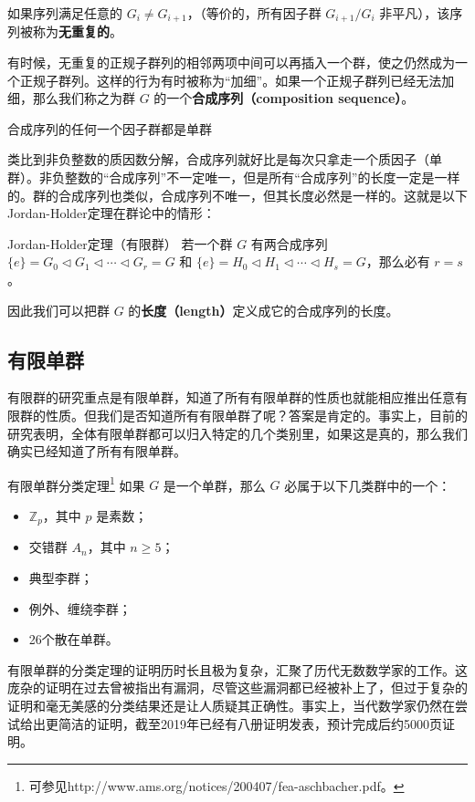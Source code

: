 如果序列满足任意的 $G_{i} \neq G_{i+1}$，（等价的，所有因子群 $G_{i+1} / G_{i}$ 非平凡），该序列被称为\textbf{无重复的}。


有时候，无重复的正规子群列的相邻两项中间可以再插入一个群，使之仍然成为一个正规子群列。这样的行为有时被称为“加细”。如果一个正规子群列已经无法加细，那么我们称之为群 $G$ 的一个\textbf{合成序列（composition sequence）}。

\begin{theorem}{}
合成序列的任何一个因子群都是单群
\end{theorem}


类比到非负整数的质因数分解，合成序列就好比是每次只拿走一个质因子（单群）。非负整数的“合成序列”不一定唯一，但是所有“合成序列”的长度一定是一样的。群的合成序列也类似，合成序列不唯一，但其长度必然是一样的。这就是以下Jordan-Holder定理在群论中的情形：

\begin{theorem}{Jordan-Holder定理（有限群）}
若一个群 $G$ 有两合成序列 $\{e\} = G_0 \triangleleft G_1 \triangleleft \cdots \triangleleft G_r = G$ 和 $\{e\} = H_0 \triangleleft  H_1 \triangleleft \cdots \triangleleft H_s = G$，那么必有 $r=s$。
\end{theorem}

因此我们可以把群 $G$ 的\textbf{长度（length）}定义成它的合成序列的长度。

\subsection{有限单群}

有限群的研究重点是有限单群，知道了所有有限单群的性质也就能相应推出任意有限群的性质。但我们是否知道所有有限单群了呢？答案是肯定的。事实上，目前的研究表明，全体有限单群都可以归入特定的几个类别里，如果这是真的，那么我们确实已经知道了所有有限单群。

\begin{definition}{有限单群分类定理\footnote{可参见http://www.ams.org/notices/200407/fea-aschbacher.pdf。}}
如果 $G$ 是一个单群，那么 $G$ 必属于以下几类群中的一个：
\begin{itemize}
\item $\mathbb{Z}_p$，其中 $p$ 是素数；
\item 交错群 $A_n$，其中 $n\geq 5$；
\item 典型李群；
\item 例外、缠绕李群；
\item 26个散在单群。
\end{itemize}
\end{definition}

有限单群的分类定理的证明历时长且极为复杂，汇聚了历代无数数学家的工作。这庞杂的证明在过去曾被指出有漏洞，尽管这些漏洞都已经被补上了，但过于复杂的证明和毫无美感的分类结果还是让人质疑其正确性。事实上，当代数学家仍然在尝试给出更简洁的证明，截至2019年已经有八册证明发表，预计完成后约5000页证明。












